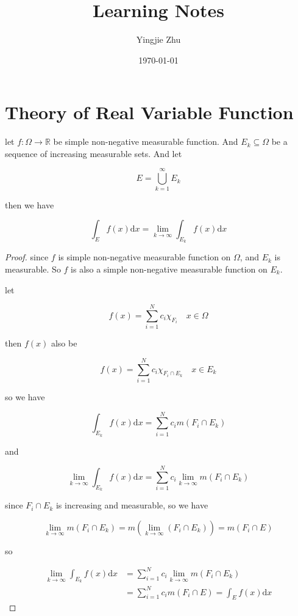 \documentclass[11pt,a4paper]{article}
\title{Learning Notes}
\author{Yingjie Zhu}
\date{\today}
\begin{document}
\maketitle

\section{Theory of Real Variable Function}

\begin{exercise}
    let $f: \Omega \to \mathbb{R}$ be simple non-negative measurable function. And $E_k \subseteq \Omega $ be a sequence of increasing
    measurable sets. 
    And let

    \[
        E = \bigcup_{k=1}^{\infty}E_k
    \]

    then we have

    \[
        \int_{E}f(x) \mathrm{d}x = \lim_{k \to \infty}\int_{E_k}f(x) \mathrm{d}x
    \]

\end{exercise}

\begin{proof}
    since $f$ is simple non-negative measurable function on $\Omega$, and $E_k$ is measurable. So $f$ is also a simple non-negative measurable function on $E_k$.

    let 

    \[
        f(x) = \sum_{i=1}^{N}c_i \chi_{F_i}\quad x \in \Omega
    \]

    then $f(x)$ also be


    \[
        f(x) = \sum_{i=1}^{N}c_i \chi_{F_i \cap E_k}\quad x \in E_k
    \]

    so we have

    \[
        \int_{E_k} f(x) \mathrm{d}x = \sum_{i=1}^{N}c_i m(F_i \cap E_k)
    \]

    and 


    \[
        \lim_{k \to \infty}\int_{E_k} f(x) \mathrm{d}x = \sum_{i=1}^{N}c_i \lim_{k \to \infty}m(F_i \cap E_k)
    \]

    since $F_i \cap E_k$ is increasing and measurable, so we have

    \[
        \lim_{k \to \infty}m(F_i \cap E_k) = m(\lim_{k \to \infty}\left( F_i \cap E_k \right)) = m(F_i \cap E)
    \]

    so 

    \begin{align*}
        \lim_{k \to \infty}\int_{E_k} f(x) \mathrm{d}x &= \sum_{i=1}^{N}c_i \lim_{k \to \infty}m(F_i \cap E_k) \\
        &= \sum_{i=1}^{N}c_i m(F_i \cap E) = \int_{E}f(x) \mathrm{d}x
    \end{align*}
\end{proof}
\end{document}
